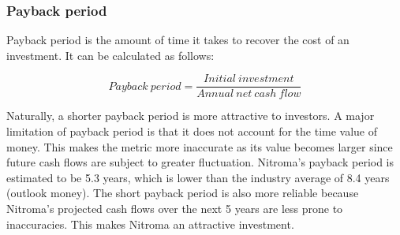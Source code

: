 

\subsubsection{Payback period}
\label{sec:pby}
Payback period is the amount of time it takes to recover the cost of an investment. It can be calculated as follows:

\begin{equation}
\label{eqn:payback}
    Payback\:period = \frac{Initial\:investment}{Annual\:net\:cash\:flow}
\end{equation}

Naturally, a shorter payback period is more attractive to investors. A major limitation of payback period is that it does not account for the time value of money. This makes the metric more inaccurate as its value becomes larger since future cash flows are subject to greater fluctuation. Nitroma’s payback period is estimated to be 5.3 years, which is lower than the industry average of 8.4 years (outlook money).  The short payback period is also more reliable because Nitroma’s projected cash flows over the next 5 years are less prone to inaccuracies. This makes Nitroma an attractive investment. 

